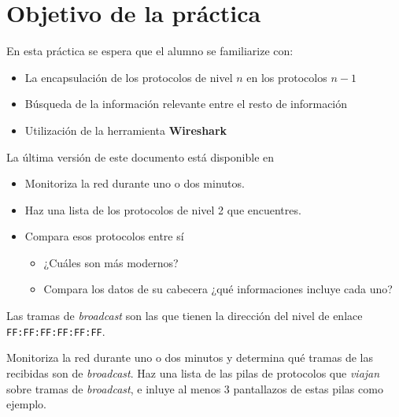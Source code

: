 

\renewcommand{\hmwkTitle}{Análisis de tráfico con \textbf{Wireshark}}

\renewcommand{\hmwkClass}{Plan. y Admin. de Redes}




\primerapagina


\section{Objetivo de la práctica}
En esta práctica se espera que el alumno se familiarize con:
\begin{itemize}
\item La encapsulación de los protocolos de nivel $n$ en los protocolos $n-1$
\item Búsqueda de la información relevante entre el resto de información
\item Utilización de la herramienta \textbf{Wireshark}
  
\end{itemize}

La última versión de este documento está disponible en 

\begin{homeworkProblem}

  \begin{itemize}
  \item Monitoriza la red durante uno o dos minutos. 
  \item Haz una lista de los protocolos de nivel 2 que encuentres.
  \item Compara esos protocolos entre sí
    \begin{itemize}
    \item ¿Cuáles son más modernos?
    \item Compara los datos de su cabecera ¿qué informaciones incluye cada uno?
    \end{itemize}
  \end{itemize}
  
\end{homeworkProblem}

\begin{homeworkProblem}

  Las tramas de \textit{broadcast} son las que tienen la dirección del nivel de enlace \texttt{FF:FF:FF:FF:FF:FF}.

  Monitoriza la red durante uno o dos minutos y determina qué tramas de las recibidas son de \textit{broadcast}. Haz una lista de las pilas de protocolos que \textit{viajan} sobre tramas de \textit{broadcast}, e inluye al menos 3 pantallazos de estas pilas como ejemplo.

\end{homeworkProblem}


